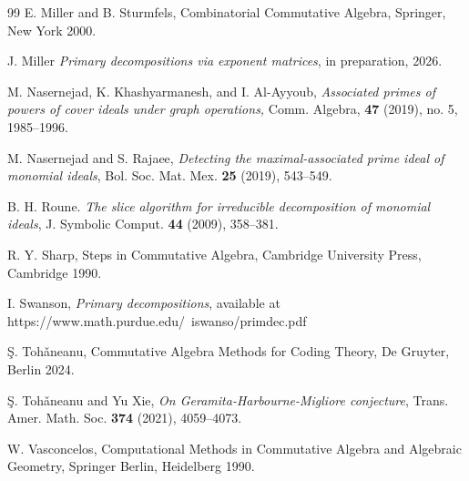 \documentclass[11pt]{amsart}   %
\begin{document}
\begin{thebibliography}{99}
 E. Miller and B. Sturmfels,
        Combinatorial Commutative Algebra,
        Springer, New York 2000.

 J. Miller
        {\em Primary decompositions via exponent matrices}, in preparation, 2026.

  M. Nasernejad,  K. Khashyarmanesh, and  I. Al-Ayyoub,
        \textit{Associated primes of powers  of cover ideals under graph operations,} Comm. 
Algebra, \textbf{47} (2019), no. 5, 1985--1996. 

 M. Nasernejad and S. Rajaee, 
        {\em Detecting the maximal-associated prime ideal of monomial ideals},
        Bol. Soc. Mat. Mex. {\bf 25} (2019), 543--549.
        


 B. H. Roune.
        {\em The slice algorithm for irreducible decomposition of monomial ideals},
        J. Symbolic Comput. {\bf 44} (2009), 358--381.

 R. Y. Sharp,
        Steps in Commutative Algebra,
        Cambridge University Press, Cambridge 1990.

 I. Swanson,
        {\em Primary decompositions},
        available at https://www.math.purdue.edu/~iswanso/primdec.pdf

 \c{S}. Toh\v{a}neanu,
        Commutative Algebra Methods for Coding Theory,
        De Gruyter, Berlin 2024.




 \c{S}. Toh\v{a}neanu and Yu Xie,
       {\em On Geramita-Harbourne-Migliore conjecture},
       Trans. Amer. Math. Soc. {\bf 374} (2021), 4059--4073.

 W. Vasconcelos,
        Computational Methods in Commutative Algebra and Algebraic Geometry,
        Springer Berlin, Heidelberg 1990.

\end{thebibliography}
\end{document}
